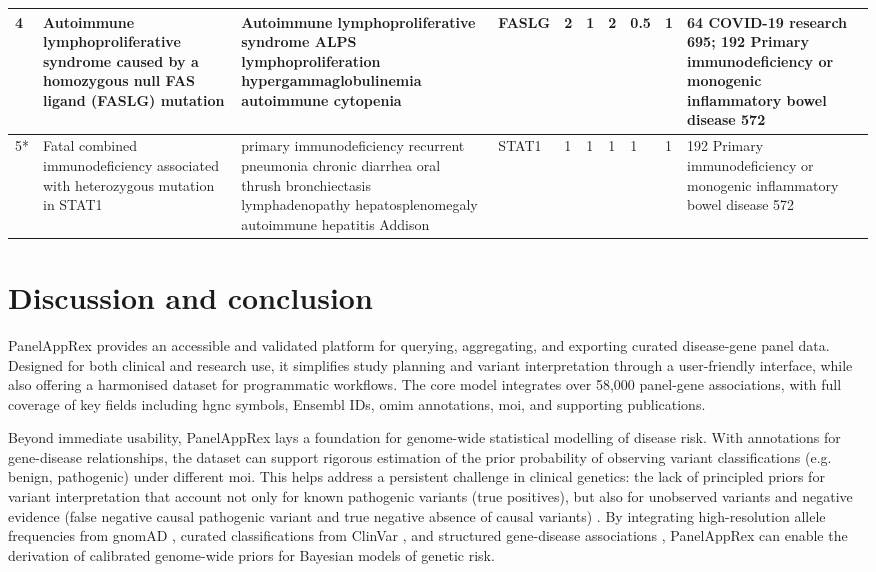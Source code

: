 \begin{table}[htbp]
{\begin{tabular}{|
    p{1cm}|
    p{4cm}|
    p{4cm}|
    p{1.4cm}|
    p{1.3cm}|
    p{1.3cm}|
    p{1.3cm}|
    p{1.3cm}|
    p{1.3cm}|
    p{5cm}|}
\hline																			
4	\cite{magerus-chatinet_autoimmune_2013}	 & 	Autoimmune lymphoproliferative syndrome caused by a homozygous null FAS ligand (FASLG) mutation	 & 	Autoimmune lymphoproliferative syndrome ALPS lymphoproliferation hypergammaglobulinemia autoimmune cytopenia	 & 	FASLG	 & 	2	 & 	1	 & 	2	 & 	0.5	 & 	1	 & 	64 COVID-19 research 695; 192 Primary immunodeficiency or monogenic inflammatory bowel disease 572 \\
\hline																			
5*	\cite{sharfe_fatal_2014}	 & 	Fatal combined immunodeficiency associated with heterozygous mutation in STAT1	 & 	primary immunodeficiency recurrent pneumonia chronic diarrhea oral thrush bronchiectasis lymphadenopathy hepatosplenomegaly autoimmune hepatitis Addison	 & 	STAT1	 & 	1	 & 	1	 & 	1	 & 	1	 & 	1	 & 	192 Primary immunodeficiency or monogenic inflammatory bowel disease 572 \\
\hline
\end{tabular}
}
\end{table}

\FloatBarrier
\section{Discussion and conclusion}
\noindent
PanelAppRex provides an accessible and validated platform for querying, aggregating, and exporting curated disease-gene panel data. Designed for both clinical and research use, it simplifies study planning and variant interpretation through a user-friendly interface, while also offering a harmonised dataset for programmatic workflows. The core model integrates over 58,000 panel-gene associations, with full coverage of key fields including \ac{hgnc} symbols, Ensembl IDs, \ac{omim} annotations, \ac{moi}, and supporting publications.

Beyond immediate usability, PanelAppRex lays a foundation for genome-wide statistical modelling of disease risk. 
With annotations for gene-disease relationships, the dataset can support rigorous estimation of the prior probability of observing  variant classifications (e.g. benign, pathogenic) under different \ac{moi}.
This helps address a persistent challenge in clinical genetics: the lack of principled priors for variant interpretation that account not only for known pathogenic variants (true positives), but also for unobserved variants and negative evidence (false negative causal pathogenic variant and true negative absence of causal variants) \cite{hannah_using_2024, zschocke_mendelian_2023}. 
By integrating high-resolution allele frequencies from gnomAD \cite{karczewski2020mutational}, curated classifications from ClinVar \cite{landrum_clinvar_2018}, and structured gene-disease associations \cite{martin_panelapp_2019}, 
PanelAppRex can enable the derivation of calibrated genome-wide priors for Bayesian models of genetic risk.

